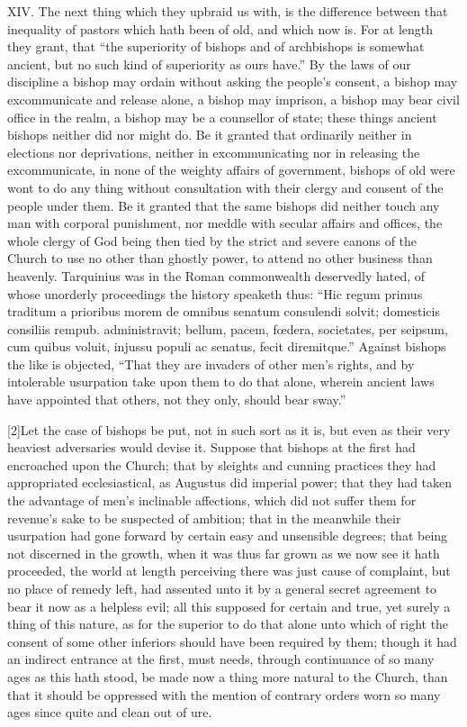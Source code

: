 XIV. The next thing which they upbraid us with, is the difference between that inequality of pastors which hath been of old, and which now is. For at length they grant, that “the superiority of bishops and of archbishops is somewhat ancient, but no such kind of superiority as ours have.” By the laws of our discipline a bishop may ordain without asking the people’s consent, a bishop may excommunicate and release alone, a bishop may imprison, a bishop may bear civil office in the realm, a bishop may be a counsellor of state; these things ancient bishops neither did nor might do. Be it granted that ordinarily neither in elections nor deprivations, neither in excommunicating nor in releasing the excommunicate, in none of the weighty affairs of government, bishops of old were wont to do any thing without consultation with their clergy and consent of the people under them. Be it granted that the same bishops did neither touch any man with corporal punishment, nor meddle with secular affairs and offices, the whole clergy of God being then tied by the strict and severe canons of the Church to use no other than ghostly power, to attend no other business than heavenly. Tarquinius was in the Roman commonwealth deservedly hated, of whose unorderly proceedings the history speaketh thus: “Hic regum primus traditum a prioribus morem de omnibus senatum consulendi solvit; domesticis consiliis rempub. administravit; bellum, pacem, fœdera, societates, per seipsum, cum quibus voluit, injussu populi ac senatus, fecit diremitque.” Against bishops the like is objected, “That they are invaders of other men’s rights, and by intolerable usurpation take upon them to do that alone, wherein ancient laws have appointed that others, not they only, should bear sway.”

[2]Let the case of bishops be put, not in such sort as it  is, but even as their very heaviest adversaries would devise it. Suppose that bishops at the first had encroached upon the Church; that by sleights and cunning practices they had appropriated ecclesiastical, as Augustus did imperial power; that they had taken the advantage of men’s inclinable affections, which did not suffer them for revenue’s sake to be suspected of ambition; that in the meanwhile their usurpation had gone forward by certain easy and unsensible degrees; that being not discerned in the growth, when it was thus far grown as we now see it hath proceeded, the world at length perceiving there was just cause of complaint, but no place of remedy left, had assented unto it by a general secret agreement to bear it now as a helpless evil; all this supposed for certain and true, yet surely a thing of this nature, as for the superior to do that alone unto which of right the consent of some other inferiors should have been required by them; though it had an indirect entrance at the first, must needs, through continuance of so many ages as this hath stood, be made now a thing more natural to the Church, than that it should be oppressed with the mention of contrary orders worn so many ages since quite and clean out of ure.

